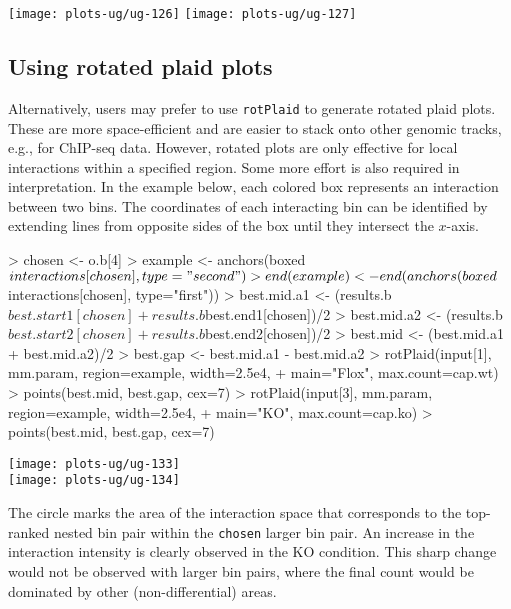 \documentclass[12pt]{report}
\renewenvironment{Schunk}{\vspace{0pt}}{\vspace{0pt}}
\newcommand{\code}[1]{{\small\texttt{#1}}}
\begin{document}
\begin{center}
\texttt{[image: plots-ug/ug-126]}
\texttt{[image: plots-ug/ug-127]}
\end{center}

\subsection{Using rotated plaid plots}
Alternatively, users may prefer to use \code{rotPlaid} to generate rotated plaid plots.
These are more space-efficient and are easier to stack onto other genomic tracks, e.g., for ChIP-seq data.
However, rotated plots are only effective for local interactions within a specified region.
Some more effort is also required in interpretation.
In the example below, each colored box represents an interaction between two bins. 
The coordinates of each interacting bin can be identified by extending lines from opposite sides of the box until they intersect the $x$-axis.





\begin{Schunk}
\begin{Sinput}
> chosen <- o.b[4]
> example <- anchors(boxed$interactions[chosen], type="second")
> end(example) <- end(anchors(boxed$interactions[chosen], type="first"))
> best.mid.a1 <- (results.b$best.start1[chosen]+results.b$best.end1[chosen])/2
> best.mid.a2 <- (results.b$best.start2[chosen]+results.b$best.end2[chosen])/2
> best.mid <- (best.mid.a1 + best.mid.a2)/2
> best.gap <- best.mid.a1 - best.mid.a2
> rotPlaid(input[1], mm.param, region=example, width=2.5e4, 
+     main="Flox", max.count=cap.wt)
> points(best.mid, best.gap, cex=7) 
> rotPlaid(input[3], mm.param, region=example, width=2.5e4,
+     main="KO", max.count=cap.ko)
> points(best.mid, best.gap, cex=7) 
\end{Sinput}
\end{Schunk}

\begin{center}
\texttt{[image: plots-ug/ug-133]}
\\
\texttt{[image: plots-ug/ug-134]}
\end{center}

The circle marks the area of the interaction space that corresponds to the top-ranked nested bin pair within the \code{chosen} larger bin pair.
An increase in the interaction intensity is clearly observed in the KO condition.
This sharp change would not be observed with larger bin pairs, where the final count would be dominated by other (non-differential) areas.
\end{document}
